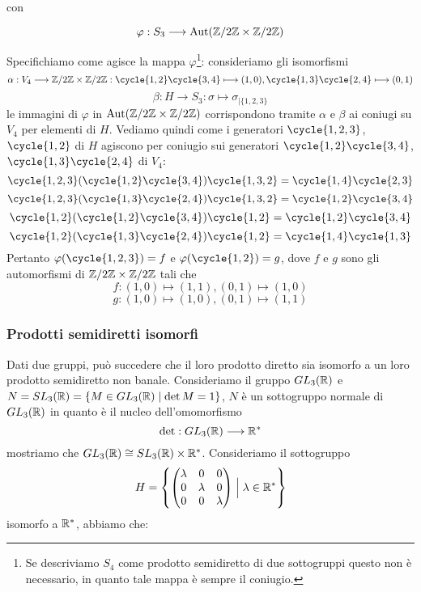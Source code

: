 \documentclass[11pt]{scrartcl}
\begin{document}
con

\[
    \varphi: S_3 \longrightarrow \operatorname{Aut}(\mathbb{Z}/{2}\mathbb{Z}\times\mathbb{Z}/{2}\mathbb{Z})
\]

Specifichiamo come agisce la mappa $\varphi$\footnote{Se descriviamo $S_4$ 
    come prodotto semidiretto di due sottogruppi questo non è 
    necessario, in quanto tale mappa è sempre il coniugio.
}:
consideriamo gli isomorfismi
\[
    \alpha: V_4\longrightarrow \Z2\times\Z2: \cycle{1, 2}\cycle{3, 4}\longmapsto (1, 0),
    \cycle{1, 3}\cycle{2, 4} \longmapsto (0, 1)
\]
\[
    \beta: H \longrightarrow S_3: \sigma \longmapsto \sigma_{\mid\{1, 2, 3\}}
\]
le immagini di $\varphi$ in $\operatorname{Aut}(\mathbb{Z}/{2}\mathbb{Z}\times\mathbb{Z}/{2}\mathbb{Z})$ corrispondono tramite $\alpha$
e $\beta$ ai coniugi su $V_4$ per elementi di $H$. Vediamo quindi come
i generatori $\cycle{1, 2, 3}$, $\cycle{1, 2}$ di $H$ agiscono per coniugio
sui generatori $\cycle{1, 2}\cycle{3, 4}$, $\cycle{1, 3}\cycle{2, 4}$ di $V_4$:
\[
    \cycle{1, 2, 3}(\cycle{1, 2}\cycle{3, 4})\cycle{1, 3, 2} = \cycle{1, 4}\cycle{2, 3}
\]
\[
    \cycle{1, 2, 3}(\cycle{1, 3}\cycle{2, 4})\cycle{1, 3, 2} = \cycle{1, 2}\cycle{3, 4}
\]
\[
    \cycle{1, 2}(\cycle{1, 2}\cycle{3, 4})\cycle{1, 2} = \cycle{1, 2}\cycle{3, 4}
\]
\[
    \cycle{1, 2}(\cycle{1, 3}\cycle{2, 4})\cycle{1, 2} = \cycle{1, 4}\cycle{1, 3}
\]
Pertanto $\varphi(\cycle{1, 2, 3}) = f$ e $\varphi(\cycle{1, 2}) = g$,
dove $f$ e $g$ sono gli automorfismi di $\mathbb{Z}/{2}\mathbb{Z}\times\mathbb{Z}/{2}\mathbb{Z}$ tali che
\[
    f: (1, 0)\longmapsto (1, 1), (0, 1) \longmapsto (1, 0)
\]
\[
    g: (1, 0)\longmapsto (1, 0), (0, 1) \longmapsto (1, 1)
\]

\subsubsection{Prodotti semidiretti isomorfi}

Dati due gruppi, può succedere che il loro prodotto diretto sia isomorfo a 
un loro prodotto semidiretto non banale.\newline
Consideriamo il gruppo $GL_3(\mathbb R)$ e $N = SL_3(\mathbb R) = \{M \in GL_3(\mathbb R)
\mid \det M = 1\}$, $N$ è un sottogruppo normale di $GL_3(\mathbb R)$ in quanto è il nucleo
dell'omomorfismo
\[
    \det: GL_3(\mathbb R) \longrightarrow \mathbb R^*
\]
mostriamo che $GL_3(\mathbb R) \cong SL_3(\mathbb R)\times\mathbb R^*$. Consideriamo il sottogruppo
\[
    H = \left\{\begin{pmatrix}
    \lambda & 0 & 0\\
    0 & \lambda & 0\\
    0 & 0 & \lambda
    \end{pmatrix}\Bigm| \lambda \in \mathbb R^* \right\}
\]isomorfo a $\mathbb R^*$, abbiamo che:
\end{document}
